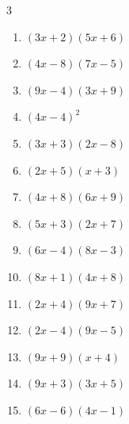 \begin{multicols}{3}
\begin{enumerate}
  \item $(3x+2)(5x+6)$


  \item $(4x-8)(7x-5)$


  \item $(9x-4)(3x+9)$


  \item $(4x-4)^{2}$


  \item $(3x+3)(2x-8)$


  \item $(2x+5)(x+3)$


  \item $(4x+8)(6x+9)$


  \item $(5x+3)(2x+7)$


  \item $(6x-4)(8x-3)$


\columnbreak %

  \item $(8x+1)(4x+8)$


  \item $(2x+4)(9x+7)$


  \item $(2x-4)(9x-5)$


  \item $(9x+9)(x+4)$


  \item $(9x+3)(3x+5)$


  \item $(6x-6)(4x-1)$


\end{enumerate}
\end{multicols}
